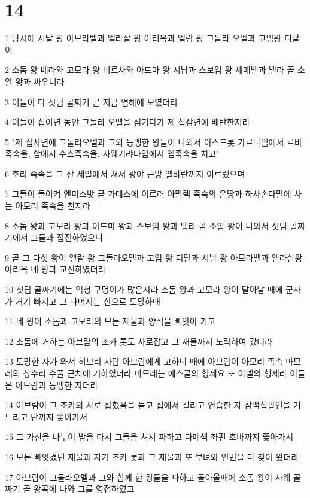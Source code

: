 \chapter{14}

\par 1 당시에 시날 왕 아므라벨과 엘라살 왕 아리옥과 엘람 왕 그돌라 오멜과 고임왕 디달이
\par 2 소돔 왕 베라와 고모라 왕 비르사와 아드마 왕 시납과 스보임 왕 세메벨과 벨라 곧 소알 왕과 싸우니라
\par 3 이들이 다 싯딤 골짜기 곧 지금 염해에 모였더라
\par 4 이들이 십이년 동안 그돌라 오멜을 섬기다가 제 십삼년에 배반한지라
\par 5 "제 십사년에 그돌라오멜과 그와 동맹한 왕들이 나와서 아스드롯 가르나임에서 르바 족속을, 함에서 수스족속을, 사웨기랴다임에서 엠족속을 치고"
\par 6 호리 족속을 그 산 세일에서 쳐서 광야 근방 엘바란까지 이르렀으며
\par 7 그들이 돌이켜 엔미스밧 곧 가데스에 이르러 아말렉 족속의 온땅과 하사손다말에 사는 아모리 족속을 친지라
\par 8 소돔 왕과 고모라 왕과 아드마 왕과 스보임 왕과 벨라 곧 소알 왕이 나와서 싯딤 골짜기에서 그들과 접전하였으니
\par 9 곧 그 다섯 왕이 엘람 왕 그돌라오멜과 고임 왕 디달과 시날 왕 아므라벨과 엘라살왕 아리옥 네 왕과 교전하였더라
\par 10 싯딤 골짜기에는 역청 구덩이가 많은지라 소돔 왕과 고모라 왕이 달아날 때에 군사가 거기 빠지고 그 나머지는 산으로 도망하매
\par 11 네 왕이 소돔과 고모라의 모든 재물과 양식을 빼앗아 가고
\par 12 소돔에 거하는 아브람의 조카 롯도 사로잡고 그 재물까지 노략하여 갔더라
\par 13 도망한 자가 와서 히브리 사람 아브람에게 고하니 때에 아브람이 아모리 족속 마므레의 상수리 수풀 근처에 거하였더라 마므레는 에스골의 형제요 또 아넬의 형제라 이들은 아브람과 동맹한 자더라
\par 14 아브람이 그 조카의 사로 잡혔음을 듣고 집에서 길리고 연습한 자 삼백십팔인을 거느리고 단까지 쫓아가서
\par 15 그 가신을 나누어 밤을 타서 그들을 쳐서 파하고 다메섹 좌편 호바까지 쫓아가서
\par 16 모든 빼앗겼던 재물과 자기 조카 롯과 그 재물과 또 부녀와 인민을 다 찾아 왔더라
\par 17 아브람이 그돌라오멜과 그와 함께 한 왕들을 파하고 돌아올때에 소돔 왕이 사웨 골짜기 곧 왕곡에 나와 그를 영접하였고
